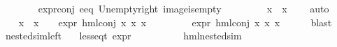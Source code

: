 \begin{isabellebody}
\ \ \ \ \ \ \isamarkupfalse%
\ expr{\isacharunderscore}{\kern0pt}{}{\isacharunderscore}{\kern0pt}conj\ e{}{\isacharunderscore}{\kern0pt}eq\ Un{\isacharunderscore}{\kern0pt}empty{\isacharunderscore}{\kern0pt}right\ image{\isacharunderscore}{\kern0pt}is{\isacharunderscore}{\kern0pt}empty\ \isanewline
\ \ \ \ \ \ \isamarkupfalse%
\ {\isacartoucheopen}x{}\ {\isacharbackquote}{\kern0pt}\ x{}\ {\isacharequal}{\kern0pt}\ {\isacharbraceleft}{\kern0pt}{\isacharbraceright}{\kern0pt}{\isacartoucheclose}\ \isamarkupfalse%
\ auto\isanewline
\ \ \isamarkupfalse%
\isanewline
\ \ \isamarkupfalse%
\ {\isacartoucheopen}{\isacharparenleft}{\kern0pt}x{}\ {\isacharbackquote}{\kern0pt}\ x{}\ {\isasymnoteq}\ {\isacharbraceleft}{\kern0pt}{\isacharbraceright}{\kern0pt}{\isacharparenright}{\kern0pt}\ {\isasymlongrightarrow}\ {\isacharparenleft}{\kern0pt}expr{\isacharunderscore}{\kern0pt}{}\ {\isacharparenleft}{\kern0pt}hml{\isacharunderscore}{\kern0pt}conj\ x{}\ x{}\ x{}{\isacharparenright}{\kern0pt}\ {\isasymge}\ {}{\isacharparenright}{\kern0pt}{\isacartoucheclose}\ \isanewline
\ \ \isamarkupfalse%
\ {\isachardoublequoteopen}{}\ {\isasymle}\ expr{\isacharunderscore}{\kern0pt}{}\ {\isacharparenleft}{\kern0pt}hml{\isacharunderscore}{\kern0pt}conj\ x{}\ x{}\ x{}{\isacharparenright}{\kern0pt}{\isachardoublequoteclose}\isanewline
\ \ \ \ \isamarkupfalse%
\ blast\isanewline
{}\isamarkupfalse%
%
\endisatagproof
{\isafoldproof}%
%
\isadelimproof
\isanewline
%
\endisadelimproof
\isanewline
{}\isamarkupfalse%
\ nested{\isacharunderscore}{\kern0pt}sim{\isacharunderscore}{\kern0pt}left{\isacharcolon}{\kern0pt}\isanewline
\ \ \ {\isachardoublequoteopen}less{\isacharunderscore}{\kern0pt}eq{\isacharunderscore}{\kern0pt}t\ {\isacharparenleft}{\kern0pt}expr\ {\isasymphi}{\isacharparenright}{\kern0pt}\ {\isacharparenleft}{\kern0pt}{\isasyminfinity}{\isacharcomma}{\kern0pt}\ {\isasyminfinity}{\isacharcomma}{\kern0pt}\ {\isasyminfinity}{\isacharcomma}{\kern0pt}\ {\isasyminfinity}{\isacharcomma}{\kern0pt}\ {\isasyminfinity}{\isacharcomma}{\kern0pt}\ {}{\isacharparenright}{\kern0pt}{\isachardoublequoteclose}\isanewline
\ \ \ {\isachardoublequoteopen}hml{\isacharunderscore}{\kern0pt}{}{\isacharunderscore}{\kern0pt}nested{\isacharunderscore}{\kern0pt}sim\ {\isasymphi}{\isachardoublequoteclose}\isanewline

\end{isabellebody}
